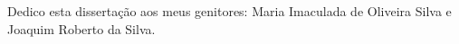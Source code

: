 
\begin{dedicatoria}%

Dedico esta dissertação aos meus genitores: Maria Imaculada de Oliveira Silva e Joaquim Roberto da Silva.

\end{dedicatoria}
